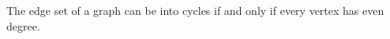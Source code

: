 \documentclass[12pt]{article}
\begin{document}
The edge set of a graph can be  into cycles if and only if every vertex has even degree.
\end{document}
